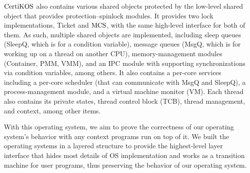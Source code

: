 $\mathrm{CertiKOS}$ also contains various shared objects protected by the low-level shared object that provides protection--spinlock modules.
It provides two lock implementations, Ticket and $\mathrm{MCS}$, with the same high-level interface for both of them. 
As such, multiple shared objects are implemented, including sleep queues (SleepQ, which is for a condition variable), 
message queues (MsgQ, which is for working up on a thread on another CPU), 
memory-management modules (Container, PMM, VMM), and an IPC module with supporting synchronizations via condition variables, among others. 
It also contains a per-core services including a per-core scheduler (that can communicate with MsgQ and SleepQ), 
a process-management module, and a virtual machine monitor (VM). 
Each thread also contains its private states, thread control block (TCB), thread management, and context, among other items.


With this operating system, we aim to prove the correctness of our operating system’s behavior with any context programs run on top of it. 
We built the operating systems in a layered structure to provide the highest-level layer interface that hides most details of OS implementation and works as a transition machine for user programs, thus preserving the behavior of our operating system.


